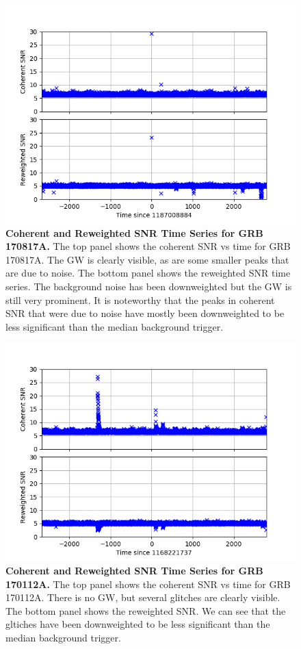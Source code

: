 \documentclass[11pt]{cuthesis}
\begin{document}
\begin{figure} %
\begin{center}
\includegraphics[width=0.8\linewidth]{network_snrs_vs_time_170817.png}
\end{center}
\caption{\textbf{Coherent and Reweighted SNR Time Series for GRB 170817A.} The top panel shows the coherent SNR vs time for GRB 170817A. The GW is clearly visible, as are some smaller peaks that are due to noise. The bottom panel shows the reweighted SNR time series. The background noise has been downweighted but the GW is still very prominent. It is noteworthy that the peaks in coherent SNR that were due to noise have mostly been downweighted to be less significant than the median background trigger.} 
\label{fig:snr vs time 170817}
\end{figure}

\begin{figure} %
\begin{center}
\includegraphics[width=0.8\linewidth]{network_snrs_vs_time_GRB170112A.png}
\end{center}
\caption{\textbf{Coherent and Reweighted SNR Time Series for GRB 170112A.} The top panel shows the coherent SNR vs time for GRB 170112A. There is no GW, but several glitches are clearly visible. The bottom panel shows the reweighted SNR. We can see that the gltiches have been downweighted to be less significant than the median background trigger.} 
\label{fig:snr vs time GRB170112A}
\end{figure}
\end{document}

